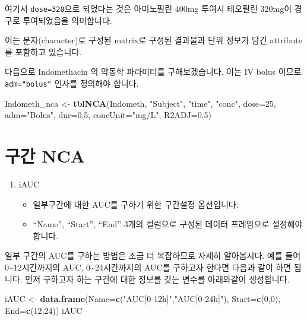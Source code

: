 \documentclass[
  12pt,
]{krantz}
\newenvironment{Shaded}{\begin{snugshade}}{\end{snugshade}}
\newcommand{\DataTypeTok}[1]{\textcolor[rgb]{0.13,0.29,0.53}{#1}}
\newcommand{\DecValTok}[1]{\textcolor[rgb]{0.00,0.00,0.81}{#1}}
\newcommand{\FloatTok}[1]{\textcolor[rgb]{0.00,0.00,0.81}{#1}}
\newcommand{\KeywordTok}[1]{\textcolor[rgb]{0.13,0.29,0.53}{\textbf{#1}}}
\newcommand{\NormalTok}[1]{#1}
\newcommand{\StringTok}[1]{\textcolor[rgb]{0.31,0.60,0.02}{#1}}
\providecommand{\tightlist}{%
  \setlength{\itemsep}{0pt}\setlength{\parskip}{0pt}}
\begin{document}
여기서 \texttt{dose=320}으로 되었다는 것은 아미노필린 400mg 투여시 테오필린 320mg이 경구로 투여되었음을 의미합니다.

이는 문자(character)로 구성된 matrix로 구성된 결과물과 단위 정보가 담긴 attribute를 포함하고 있습니다.

다음으로 Indomethacin 의 약동학 파라미터를 구해보겠습니다.
이는 IV bolus 이므로 \texttt{adm="bolus"} 인자를 정의해야 합니다.

\begin{Shaded}
\begin{Highlighting}[]
\NormalTok{Indometh\_nca \textless{}{-}}\StringTok{ }\KeywordTok{tblNCA}\NormalTok{(Indometh, }\StringTok{"Subject"}\NormalTok{, }\StringTok{"time"}\NormalTok{, }\StringTok{"conc"}\NormalTok{, }
                       \DataTypeTok{dose=}\DecValTok{25}\NormalTok{, }\DataTypeTok{adm=}\StringTok{"Bolus"}\NormalTok{, }\DataTypeTok{dur=}\FloatTok{0.5}\NormalTok{, }\DataTypeTok{concUnit=}\StringTok{"mg/L"}\NormalTok{, }\DataTypeTok{R2ADJ=}\FloatTok{0.5}\NormalTok{)}
\end{Highlighting}
\end{Shaded}

\hypertarget{interval-NCA}{%
\section{구간 NCA}\label{interval-NCA}}

\begin{enumerate}
\def\labelenumi{\arabic{enumi}.}
\tightlist
\item
  iAUC

  \begin{itemize}
  \tightlist
  \item
    일부구간에 대한 AUC를 구하기 위한 구간설정 옵션입니다.
  \item
    ``Name'', ``Start'', ``End'' 3개의 컬럼으로 구성된 데이터 프레임으로 설정해야 합니다.
  \end{itemize}
\end{enumerate}

일부 구간의 AUC를 구하는 방법은 조금 더 복잡하므로 자세히 알아봅시다.
예를 들어 0\textasciitilde12시간까지의 AUC, 0\textasciitilde24시간까지의 AUC를 구하고자 한다면 다음과 같이 하면 됩니다.
먼저 구하고자 하는 구간에 대한 정보를 갖는 변수를 아래와같이 생성합니다.

\begin{Shaded}
\begin{Highlighting}[]
\NormalTok{iAUC \textless{}{-}}\StringTok{ }\KeywordTok{data.frame}\NormalTok{(}\DataTypeTok{Name=}\KeywordTok{c}\NormalTok{(}\StringTok{"AUC[0{-}12h]"}\NormalTok{,}\StringTok{"AUC[0{-}24h]"}\NormalTok{), }\DataTypeTok{Start=}\KeywordTok{c}\NormalTok{(}\DecValTok{0}\NormalTok{,}\DecValTok{0}\NormalTok{), }\DataTypeTok{End=}\KeywordTok{c}\NormalTok{(}\DecValTok{12}\NormalTok{,}\DecValTok{24}\NormalTok{))}
\NormalTok{iAUC}
\end{Highlighting}
\end{Shaded}
\end{document}
